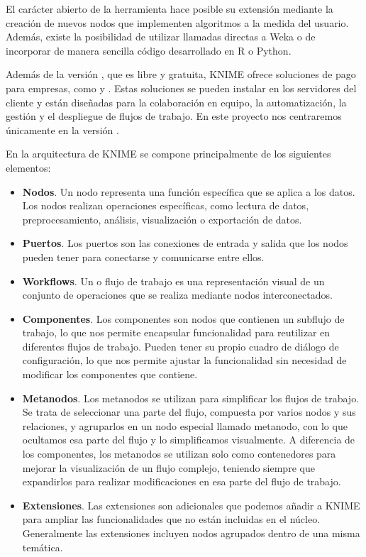 El carácter abierto de la herramienta hace posible su extensión mediante la creación de nuevos nodos que 
implementen algoritmos a la medida del usuario. Además, existe la posibilidad de utilizar llamadas directas 
a Weka o de incorporar de manera sencilla código desarrollado en R o Python.
\

Además de la versión , que es libre y gratuita, KNIME ofrece soluciones de pago para empresas, como  
y . Estas soluciones se pueden instalar en los servidores del cliente y están diseñadas para la 
colaboración en equipo, la automatización, la gestión y el despliegue de flujos de trabajo. En este proyecto nos centraremos únicamente
en la versión . 
\

En la arquitectura de KNIME se compone principalmente de los siguientes elementos: 

\begin{itemize}
	\item \textbf{Nodos}. Un nodo representa una función específica que se aplica a los datos. Los nodos realizan operaciones específicas, 
	 como lectura de datos, preprocesamiento, análisis, visualización o exportación de datos.
	\item \textbf{Puertos}. Los puertos son las conexiones de entrada y salida que los nodos pueden tener para conectarse y 
	 comunicarse entre ellos. 
	\item \textbf{Workflows}. Un  o flujo de trabajo es una representación visual de un conjunto de operaciones que se realiza 
	mediante nodos interconectados. 
	\item \textbf{Componentes}. Los componentes son nodos que contienen un subflujo de trabajo, lo que nos permite encapsular
	funcionalidad para reutilizar en diferentes flujos de trabajo. Pueden tener su propio cuadro de diálogo de configuración, lo que nos permite 
	ajustar la funcionalidad sin necesidad de modificar los componentes que contiene. 
	\item \textbf{Metanodos}. Los metanodos se utilizan para simplificar los flujos de trabajo. Se trata de seleccionar una parte del flujo, 
	compuesta por varios nodos y sus relaciones, y agruparlos en un nodo especial llamado metanodo, con lo que ocultamos esa parte del flujo 
	y lo simplificamos visualmente. A diferencia de los componentes, los metanodos se utilizan solo como contenedores para mejorar la visualización 
	de un flujo complejo, teniendo siempre que expandirlos para realizar modificaciones en esa parte del flujo de trabajo.
	\item \textbf{Extensiones}. Las extensiones son  adicionales que podemos añadir a KNIME para ampliar las funcionalidades que 
	no están incluidas en el núcleo. Generalmente las extensiones incluyen nodos agrupados dentro de una misma temática. 
\end{itemize}

